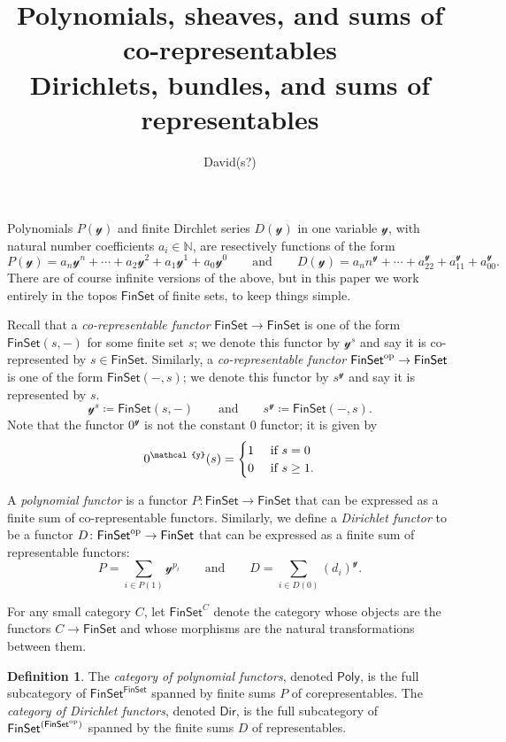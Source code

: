 \documentclass[11pt, article, one side]{memoir}
\theoremstyle{theorem}
\theoremstyle{definition}
\newtheorem{definition}[equation]{Definition}
\theoremstyle{remark}
\newcommand{\cat}[1]{\mathcal{#1}}%
\newcommand{\Cat}[1]{\mathsf{#1}}%
\newcommand{\op}{^\tn{op}}
\newcommand{\tn}[1]{\textnormal{#1}}
\newcommand{\nn}{\mathbb{N}}
\newcommand{\finset}{\Cat{FinSet}}
\newcommand{\yon}{\mathcal{y}}
\newcommand{\poly}{\Cat{Poly}}
\newcommand{\dir}{\Cat{Dir}}
\newcommand{\qqand}{\qquad\text{and}\qquad}
\begin{document}
\title{Polynomials, sheaves, and sums of co-representables\\Dirichlets, bundles, and sums of representables}

\author{David(s?)}

\maketitle

Polynomials $P(\yon)$ and finite Dirchlet series $D(\yon)$ in one variable $\cat{y}$, with natural number coefficients $a_i\in\nn$, are resectively functions of the form
\[
  P(\yon)=a_n\yon^n+\cdots+a_2\yon^2+a_1\yon^1+a_0\yon^0
  \qqand
  D(\yon)=a_nn^\yon+\cdots+a_22^\yon+a_11^\yon+a_00^\yon.
\]
There are of course infinite versions of the above, but in this paper we work entirely in the topos $\finset$ of finite sets, to keep things simple.

Recall that a \emph{co-representable functor} $\finset\to\finset$ is one of the form $\finset(s, -)$ for some finite set $s$; we denote this functor by $\yon^s$ and say it is co-represented by $s\in\finset$. Similarly, a \emph{co-representable functor} $\finset\op\to\finset$ is one of the form $\finset(-,s)$; we denote this functor by $s^\yon$ and say it is represented by $s$.
\[
  \yon^s \coloneqq \finset(s,-)
  \qqand
  s^\yon\coloneqq\finset(-,s).
\]
Note that the functor $0^\yon$ is not the constant $0$ functor; it is given by
\[
0^\yon(s)=
\begin{cases}
1&\tn{ if } s=0\\
0&\tn{ if } s\geq1.
\end{cases}
\]

A \emph{polynomial functor} \cite{GambinoKock} is a functor $P\colon\finset\to\finset$ that can be expressed as a finite sum of co-representable functors. Similarly, we define a \emph{Dirichlet functor} to be a functor $D\colon\finset\op\to\finset$ that can be expressed as a finite sum of representable functors:
\[
  P=\sum_{i\in P(1)}\yon^{p_i}
  \qqand
  D=\sum_{i\in D(0)}(d_i)^\yon.
\]

For any small category $C$, let $\finset^C$ denote the category whose objects are the functors $C\to\finset$ and whose morphisms are the natural transformations between them.

\begin{definition}
The \emph{category of polynomial functors}, denoted $\poly$, is the full subcategory of $\finset^\finset$ spanned by finite sums $P$ of corepresentables. The \emph{category of Dirichlet functors}, denoted $\dir$, is the full subcategory of $\finset^{(\finset\op)}$ spanned by the finite sums $D$ of representables.
\end{definition}
\end{document}
